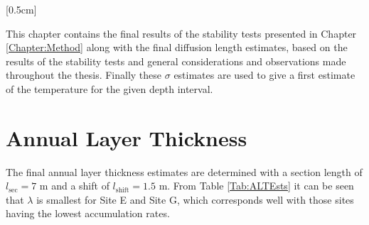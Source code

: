 \documentclass[../../CompleteThesis2/Complete_2ndDraft]{subfiles}
\begin{document}
[0.5cm]%

This chapter contains the final results of the stability tests presented in Chapter \ref{Chapter:Method} along with the final diffusion length estimates, based on the results of the stability tests and general considerations and observations made throughout the thesis. Finally these $\sigma$ estimates are used to give a first estimate of the temperature for the given depth interval.

\section[Annual Layer Thickness]{Annual Layer Thickness}
\label{Sec:Results_ALT}

The final annual layer thickness estimates are determined with a section length of $l_{\text{sec}}=7$ m and a shift of $l_{\text{shift}}=1.5$ m. From Table \ref{Tab:ALTEsts} it can be seen that $\lambda$ is smallest for Site E and Site G, which corresponds well with those sites having the lowest accumulation rates.
\end{document}
